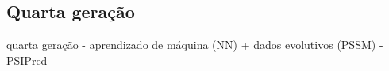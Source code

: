 \subsection{Quarta geração} 

quarta geração - aprendizado de máquina (NN) + dados evolutivos (PSSM) - PSIPred